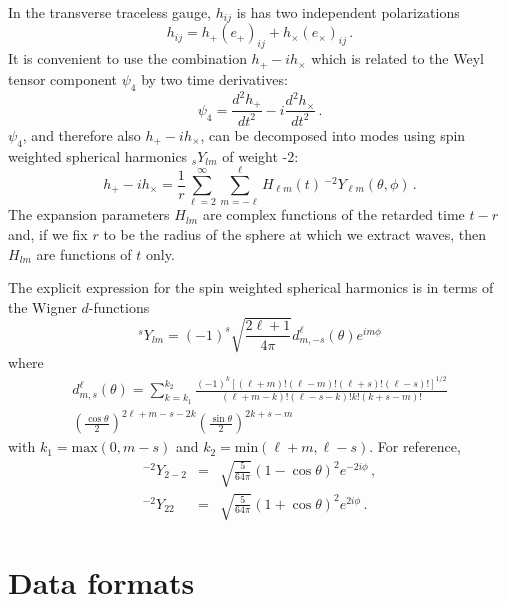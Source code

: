 \documentclass[amsmath,amssymb]{article}
\begin{document}
In the transverse traceless gauge, $h_{ij}$ is has two independent
polarizations 
\begin{equation}
  \label{eq:2}
  h_{ij} = h_+ (e_+)_{ij} + h_\times (e_\times)_{ij}\,.
\end{equation}
It is convenient to use the combination $h_+ - ih_\times$ which is
related to the Weyl tensor component $\psi_4$ by two time derivatives:
\begin{equation}
  \label{eq:3}
  \psi_4 = \frac{d^2h_+}{dt^2} - i\frac{d^2h_\times}{dt^2}\,.
\end{equation}
$\psi_4$, and therefore also $h_+-ih_\times$, can be decomposed into
modes using spin weighted spherical harmonics ${}_sY_{lm}$ of weight
-2:
\begin{equation}
  \label{eq:4}
  h_+ - ih_\times = \frac{1}{r}\sum_{\ell=2}^{\infty}\sum_{m=-\ell}^\ell H_{\ell m}(t)\,
  {}^{-2}Y_{\ell m}(\theta,\phi)\,.
\end{equation}
The expansion parameters $H_{lm}$ are complex functions of the retarded time
$t-r$ and, if we fix $r$ to be the radius of the sphere at which we
extract waves, then $H_{lm}$ are functions of $t$ only.  

The explicit expression for the spin weighted spherical harmonics is
in terms of the Wigner $d$-functions
\begin{equation}
  \label{eq:5}
   {}^sY_{lm} = (-1)^s\sqrt{\frac{2\ell+1}{4\pi}} d^\ell_{m,-s}(\theta)e^{im\phi}
\end{equation}
where
\begin{eqnarray}
  \label{eq:6}
  d^\ell_{m,s}(\theta) = \sum_{k = k_1}^{k_2}
    \frac{(-1)^k[(\ell+m)!(\ell-m)!(\ell+s)!(\ell-s)!]^{1/2}}{(\ell +m
      -k)!(\ell-s-k)!k!(k+s-m)!} \\ \left(\frac{\cos
        \theta}{2}\right)^{2\ell+m-s-2k}\left(\frac{\sin\theta}{2}\right)^{2k+s-m} 
\end{eqnarray}
with $k_1 = \textrm{max}(0, m-s)$ and $k_2=\textrm{min}(\ell+m,
\ell-s)$.  For reference,
\begin{eqnarray}
  \label{eq:7}
  {}^{-2}Y_{2-2} &=& \sqrt{\frac{5}{64\pi}}(1-\cos\theta)^2e^{-2i\phi}\,, \\
  {}^{-2}Y_{22} &=& \sqrt{\frac{5}{64\pi}}(1+\cos\theta)^2e^{2i\phi} \,.
\end{eqnarray}


\section{Data formats}
\label{sec:format}
\end{document}
